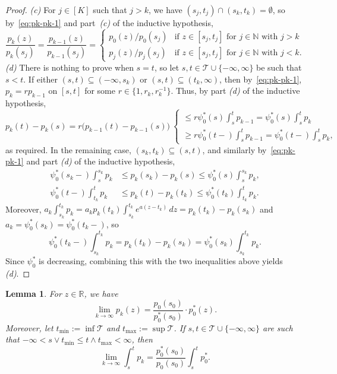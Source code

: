 \documentclass[a4paper]{article}
\newcommand{\N}{\mathbb{N}}
\newcommand{\R}{\mathbb{R}}
\newtheorem{lemma}[theorem]{Lemma}
\theoremstyle{definition}
\begin{document}
\begin{proof}
\medskip
\noindent
\textit{(c)} For $j \in [K]$ such that $j > k$, we have $(s_j,t_j) \cap (s_k,t_k) = \emptyset$, so by~\eqref{eq:pk-pk-1} and part~\textit{(c)} of the inductive hypothesis, 
\[
\frac{p_k(z)}{p_k(s_j)} = \frac{p_{k-1}(z)}{p_{k-1}(s_j)} =
\begin{cases}
p_0(z)/p_0(s_j) &\text{if }z \in [s_j,t_j]\text{ for }j \in \N\text{ with }j > k \\
p_j(z)/p_j(s_j) &\text{if }z \in [s_j,t_j]\text{ for }j \in \N\text{ with }j < k.
\end{cases}
\]
\textit{(d)} There is nothing to prove when $s = t$, so let $s,t \in \mathcal{T} \cup \{-\infty,\infty\}$ be such that $s < t$. If either $(s,t) \subseteq (-\infty,s_k)$ or $(s,t) \subseteq (t_k,\infty)$, then by~\eqref{eq:pk-pk-1}, $p_k = rp_{k-1}$ on $[s,t]$ for some $r \in \{1,r_k,r_k^{-1}\}$. Thus, by part \textit{(d)} of the inductive hypothesis,
\[
p_k(t) - p_k(s) = r\bigl(p_{k-1}(t) - p_{k-1}(s)\bigl) \:
\begin{cases}
\leq r\psi_0^*(s)\int_s^t p_{k-1} = \psi_0^*(s)\int_s^t p_k \\[3pt]
\geq r\psi_0^*(t-)\int_s^t p_{k-1} = \psi_0^*(t-)\int_s^t p_k,
\end{cases}
\]
as required. In the remaining case, $(s_k,t_k) \subseteq (s,t)$, and similarly by~\eqref{eq:pk-pk-1} and part \textit{(d)} of the inductive hypothesis,
\begin{align*}
\psi_0^*(s_k-)\int_s^{s_k} p_k &\leq p_k(s_k) - p_k(s) \leq \psi_0^*(s)\int_s^{s_k} p_k, \\
\psi_0^*(t-)\int_{t_k}^t p_k &\leq p_k(t) - p_k(t_k) \leq \psi_0^*(t_k)\int_{t_k}^t p_k.
\end{align*}
Moreover, $a_k\int_{s_k}^{t_k}p_k = a_k p_k(t_k)\int_{s_k}^{t_k}e^{a(z - t_k)}\,dz = p_k(t_k) - p_k(s_k)$ and $a_k = \psi_0^*(s_k) = \psi_0^*(t_k-)$, so
\[
\psi_0^*(t_k-)\int_{s_k}^{t_k} p_k = p_k(t_k) - p_k(s_k) = \psi_0^*(s_k)\int_{s_k}^{t_k} p_k.
\]
Since $\psi_0^*$ is decreasing, 
combining this with the two inequalities above yields \textit{(d)}.
\end{proof}

\begin{lemma}
\label{lem:pk-limit}
For $z \in \R$, we have
\begin{equation}
\label{eq:pk-limit}
\lim_{k \to \infty}p_k(z) = \frac{p_0(s_0)}{p_0^*(s_0)} \cdot p_0^*(z).
\end{equation}
Moreover, let $t_{\min} := \inf\mathcal{T}$ and $t_{\max} := \sup\mathcal{T}$. If $s,t \in \mathcal{T} \cup \{-\infty,\infty\}$ are such that $-\infty < s \vee t_{\min} \leq t \wedge t_{\max} < \infty$, then
\begin{equation}
\label{eq:pk-int-limit}
\lim_{k \to \infty}\int_s^t p_k = \frac{p_0^*(s_0)}{p_0(s_0)} \int_s^t p_0^*.
\end{equation}
\end{lemma}
\end{document}
